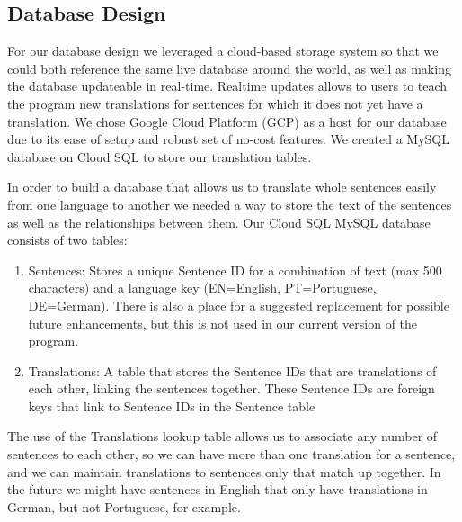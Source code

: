 \documentclass[runningheads]{llncs}
\begin{document}
	\subsection{Database Design}
	For our database design we leveraged a cloud-based storage system so that we could both reference the same live database around the world, as well as making the database updateable in real-time. Realtime updates allows to users to teach the program new translations for sentences for which it does not yet have a translation. We chose Google Cloud Platform (GCP) as a host for our database due to its ease of setup and robust set of no-cost features. We created a MySQL database on Cloud SQL to store our translation tables.
	
	In order to build a database that allows us to translate whole sentences easily from one language to another we needed a way to store the text of the sentences as well as the relationships between them. Our Cloud SQL MySQL database consists of two tables:
			
		\begin{enumerate}
			\item Sentences: Stores a unique Sentence ID for a combination of text (max 500 characters) and a language key (EN=English, PT=Portuguese, DE=German). There is also a place for a suggested replacement for possible future enhancements, but this is not used in our current version of the program.
			\item Translations: A table that stores the Sentence IDs that are translations of each other, linking the sentences together. These Sentence IDs are foreign keys that link to Sentence IDs in the Sentence table
		\end{enumerate}

	The use of the Translations lookup table allows us to associate any number of sentences to each other, so we can have more than one translation for a sentence, and we can maintain translations to sentences only that match up together. In the future we might have sentences in English that only have translations in German, but not Portuguese, for example. 	
\newline
	\begin{minipage}{\linewidth}
			\hspace*{-.25in}
  			 \noindent{}
			\label{fig:Database Diagrams}
			\vspace*{1cm}
	\end{minipage}
	\afterpage{\clearpage}
\end{document}
